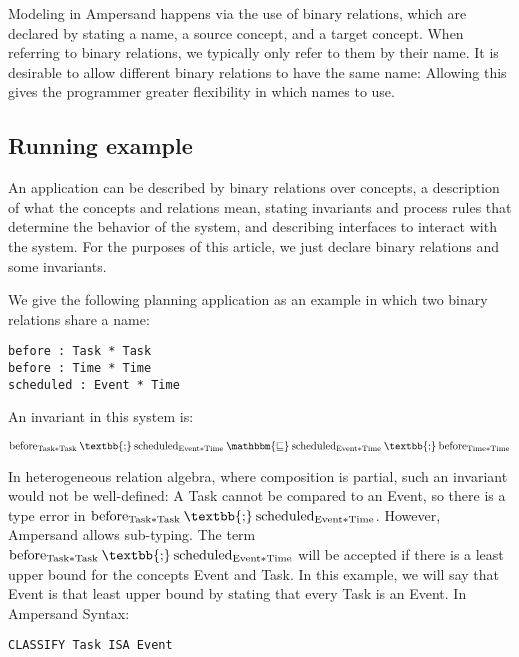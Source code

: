 \documentclass[12pt]{article}
\newcommand{\typesemi}{\mathbin{\text{\textbb{;}}}}
\newcommand{\typesubset}{\mathbin{\mathbbm{\sqsubseteq}}}
\begin{document}
Modeling in Ampersand happens via the use of binary relations, which are declared by stating a name, a source concept, and a target concept.
When referring to binary relations, we typically only refer to them by their name.
It is desirable to allow different binary relations to have the same name:
Allowing this gives the programmer greater flexibility in which names to use.

\subsection*{Running example}
An application can be described by binary relations over concepts, a description of what the concepts and relations mean, stating invariants and process rules that determine the behavior of the system, and describing interfaces to interact with the system.
For the purposes of this article, we just declare binary relations and some invariants.

We give the following planning application as an example in which two binary relations share a name:
\begin{verbatim}
before : Task * Task
before : Time * Time
scheduled : Event * Time
\end{verbatim}

An invariant in this system is:

\[
\mathrm{before}_{\mathrm{Task * Task}}\typesemi\mathrm{scheduled}_{\mathrm{Event * Time}} \typesubset \mathrm{scheduled}_\mathrm{Event * Time}\typesemi\mathrm{before}_{\mathrm{Time * Time}}
\]

In heterogeneous relation algebra, where composition is partial, such an invariant would not be well-defined: A Task cannot be compared to an Event, so there is a type error in $\mathrm{before}_{\mathrm{Task * Task}}\typesemi\mathrm{scheduled}_{\mathrm{Event * Time}}$.
However, Ampersand allows sub-typing.
The term $\mathrm{before}_{\mathrm{Task * Task}}\typesemi\mathrm{scheduled}_{\mathrm{Event * Time}}$ will be accepted if there is a least upper bound for the concepts Event and Task.
In this example, we will say that Event is that least upper bound by stating that every Task is an Event.
In Ampersand Syntax:

\begin{verbatim}
CLASSIFY Task ISA Event
\end{verbatim}
\end{document}
